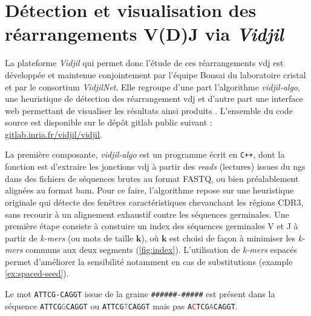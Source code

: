 \section{Détection et visualisation des réarrangements V(D)J via \textit{Vidjil}}

La plateforme \textit{Vidjil} qui permet donc l'étude de ces réarrangements \gls{vdj} est développée et maintenue 
conjointement par l'équipe Bonsai du laboratoire \gls{cristal} et par le consortium \textit{VidjilNet}. 
Elle regroupe d'une part l'algorithme \textit{vidjil-algo}, une heuristique de détection des réarrangement \gls{vdj} 
\cite{giraudFastMulticlonalClusterization2014b} et d'autre part une interface web permettant de visualiser les 
résultats ainsi produits \cite{duezVidjilWebPlatform2016}. L'ensemble du code source est disponible sur le dépôt gitlab 
public suivant : \href{https://gitlab.inria.fr/vidjil/vidjil}{gitlab.inria.fr/vidjil/vidjil}.

\vspace{1em}

La première composante, \textit{vidjil-algo} est un programme écrit en \texttt{C++}, dont la fonction est d'extraire 
les jonctions \gls{vdj} à partir des \textit{reads} (lectures) issues du \gls{ngs} dans des fichiers de séquences 
brutes au format FASTQ, ou bien préalablement alignées au format \gls{bam}. Pour ce faire, l'algorithme 
repose sur une heuristique originale qui détecte des fenêtres caractéristiques chevauchant les régions CDR3, 
sans recourir à un alignement exhaustif contre les séquences germinales. Une première étape consiste à constuire un index 
des séquences germinales V et J à partir de \textit{k-mers} (ou mots de taille $\mathbf{k}$), où $\mathbf{k}$ est choisi de façon à 
minimiser les \textit{k-mers} communs aux deux segments (\autoref{fig:index}). L'utilisation de \textit{k-mers} espacés permet d'améliorer la sensibilité 
notamment en cas de substitutions (example \ref{ex:spaced-seed}).

\begin{examplebox}[label={ex:spaced-seed}]
    Le mot \texttt{ATTCG-CAGGT} issue de la graine \texttt{\#\#\#\#\#\#-\#\#\#\#\#} 
    est présent dans la séquence \texttt{ATTCG\textcolor{gray}{G}CAGGT} ou \texttt{ATTCG\textcolor{gray}{T}CAGGT} 
    mais pas \texttt{A\textcolor{red}{C}TCG\textcolor{gray}{A}CAGGT}.
\end{examplebox}


    
